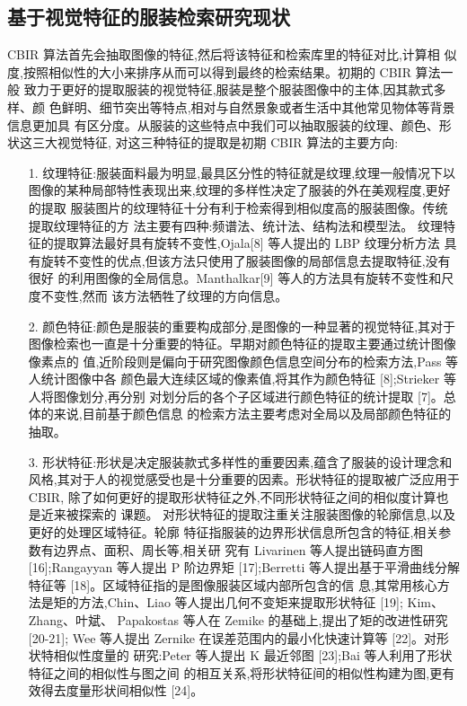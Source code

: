 \subsection{基于视觉特征的服装检索研究现状}

CBIR 算法首先会抽取图像的特征,然后将该特征和检索库里的特征对比,计算相
似度,按照相似性的大小来排序从而可以得到最终的检索结果。初期的 CBIR 算法一般
致力于更好的提取服装的视觉特征,服装是整个服装图像中的主体,因其款式多样、颜
色鲜明、细节突出等特点,相对与自然景象或者生活中其他常见物体等背景信息更加具
有区分度。从服装的这些特点中我们可以抽取服装的纹理、颜色、形状这三大视觉特征,
对这三种特征的提取是初期 CBIR 算法的主要方向:
\begin{itemize}
\item[1.]纹理特征:服装面料最为明显,最具区分性的特征就是纹理,纹理一般情况下以
图像的某种局部特性表现出来,纹理的多样性决定了服装的外在美观程度,更好的提取
服装图片的纹理特征十分有利于检索得到相似度高的服装图像。传统提取纹理特征的方
法主要有四种:频谱法、统计法、结构法和模型法。
纹理特征的提取算法最好具有旋转不变性,Ojala[8] 等人提出的 LBP 纹理分析方法
具有旋转不变性的优点,但该方法只使用了服装图像的局部信息去提取特征,没有很好
的利用图像的全局信息。Manthalkar[9] 等人的方法具有旋转不变性和尺度不变性,然而
该方法牺牲了纹理的方向信息。

\item[2.] 颜色特征:颜色是服装的重要构成部分,是图像的一种显著的视觉特征,其对于
图像检索也一直是十分重要的特征。早期对颜色特征的提取主要通过统计图像像素点的
值,近阶段则是偏向于研究图像颜色信息空间分布的检索方法,Pass 等人统计图像中各
颜色最大连续区域的像素值,将其作为颜色特征 [8];Strieker 等人将图像划分,再分别
对划分后的各个子区域进行颜色特征的统计提取 [7]。总体的来说,目前基于颜色信息
的检索方法主要考虑对全局以及局部颜色特征的抽取。

\item[3.] 形状特征:形状是决定服装款式多样性的重要因素,蕴含了服装的设计理念和
风格,其对于人的视觉感受也是十分重要的因素。形状特征的提取被广泛应用于 CBIR,
除了如何更好的提取形状特征之外,不同形状特征之间的相似度计算也是近来被探索的
课题。
对形状特征的提取注重关注服装图像的轮廓信息,以及更好的处理区域特征。轮廓
特征指服装的边界形状信息所包含的特征,相关参数有边界点、面积、周长等,相关研
究有 Livarinen 等人提出链码直方图 [16];Rangayyan 等人提出 P 阶边界矩 [17];Berretti
等人提出基于平滑曲线分解特征等 [18]。区域特征指的是图像服装区域内部所包含的信
息,其常用核心方法是矩的方法,Chin、Liao 等人提出几何不变矩来提取形状特征 [19];
Kim、 Zhang、叶斌、 Papakostas 等人在 Zemike 的基础上,提出了矩的改进性研究 [20-21];
Wee 等人提出 Zernike 在误差范围内的最小化快速计算等 [22]。对形状特相似性度量的
研究:Peter 等人提出 K 最近邻图 [23];Bai 等人利用了形状特征之间的相似性与图之间
的相互关系,将形状特征间的相似性构建为图,更有效得去度量形状间相似性 [24]。

\end{itemize}

